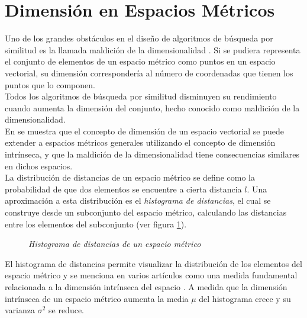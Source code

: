 


\section{Dimensi\'on en Espacios M\'etricos}

Uno de los grandes obst\'aculos en el dise\~no de algoritmos de b\'usqueda por similitud es la
llamada maldici\'on de la dimensionalidad \cite{oursurvey}. Si se pudiera representa el conjunto
de elementos de un espacio m\'etrico como puntos en un espacio vectorial, su dimensi\'on 
corresponder\'ia al n\'umero de coordenadas que tienen los puntos que lo componen. \\
Todos los algoritmos de b\'usqueda por similitud disminuyen su rendimiento cuando aumenta la  dimensi\'on del conjunto, hecho conocido como maldici\'on de la dimensionalidad. \\

En \cite{oursurvey} se muestra que
el concepto de dimensi\'on de un espacio vectorial se puede extender a espacios m\'etricos generales utilizando el concepto de dimensi\'on intr\'inseca, y que la maldici\'on de la dimensionalidad
tiene consecuencias similares en dichos espacios.\\


La distribuci\'on de distancias de un espacio m\'etrico se define como la probabilidad 
de que dos elementos se encuentre a cierta distancia $l$. Una aproximaci\'on a 
esta distribuci\'on es el \textit{histograma de distancias}, el cual se construye
 desde un subconjunto del espacio m\'etrico, calculando las distancias entre los elementos del subconjunto (ver figura \ref{defineH}).
 
 \begin{figure}[tb!]
\centerline{%
  }
  \caption [Histograma de distancias de un espacio m\'etrico]
  {\footnotesize {\textsl {Histograma de distancias de un espacio m\'etrico}}}
\label{defineH}
\end{figure}

El histograma de distancias permite visualizar la distribuci\'on de los 
elementos del espacio m\'etrico y se menciona en varios art\'iculos como una medida
 fundamental relacionada a la dimensi\'on intr\'inseca del espacio \cite{Bri95, CM97, cn00,alenex,CPZ98a}. A medida que la dimensi\'on intr\'inseca de un espacio m\'etrico aumenta
la media  $\mu$ del histograma crece y su varianza $\sigma^{2}$ se reduce.\\

